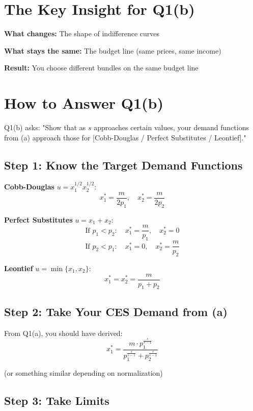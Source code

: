 \documentclass[12pt]{article}
\begin{document}
\section*{The Key Insight for Q1(b)}

\begin{center}
\colorbox{yellow!30}{
\begin{minipage}{0.9\textwidth}
\textbf{What changes:} The shape of indifference curves

\textbf{What stays the same:} The budget line (same prices, same income)

\textbf{Result:} You choose different bundles on the same budget line
\end{minipage}
}
\end{center}

\newpage

\section*{How to Answer Q1(b)}

Q1(b) asks: "Show that as $s$ approaches certain values, your demand functions from (a) approach those for [Cobb-Douglas / Perfect Substitutes / Leontief]."

\subsection*{Step 1: Know the Target Demand Functions}

\textbf{Cobb-Douglas} $u = x_1^{1/2} x_2^{1/2}$:
$$x_1^* = \frac{m}{2p_1}, \quad x_2^* = \frac{m}{2p_2}$$

\textbf{Perfect Substitutes} $u = x_1 + x_2$:
$$\text{If } p_1 < p_2: \quad x_1^* = \frac{m}{p_1}, \quad x_2^* = 0$$
$$\text{If } p_2 < p_1: \quad x_1^* = 0, \quad x_2^* = \frac{m}{p_2}$$

\textbf{Leontief} $u = \min\{x_1, x_2\}$:
$$x_1^* = x_2^* = \frac{m}{p_1 + p_2}$$

\subsection*{Step 2: Take Your CES Demand from (a)}

From Q1(a), you should have derived:
$$x_1^* = \frac{m \cdot p_1^{\frac{s}{s-1}}}{p_1^{\frac{s}{s-1}} + p_2^{\frac{s}{s-1}}}$$

(or something similar depending on normalization)

\subsection*{Step 3: Take Limits}
\end{document}
